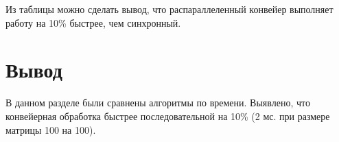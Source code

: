 Из таблицы можно сделать вывод, что распараллеленный конвейер выполняет работу на 10\% быстрее, чем синхронный.



\section*{Вывод}

В данном разделе были сравнены алгоритмы по времени.
Выявлено, что конвейерная обработка быстрее последовательной на 10\% (2 мс. при размере матрицы 100 на 100). 
 
